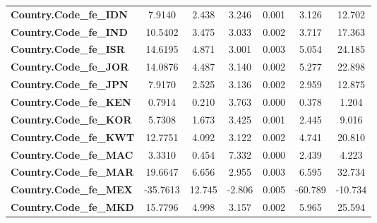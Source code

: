 \begin{center}
\begin{tabular}{lcccccc}
\textbf{Country.Code\_fe\_IDN}                                     &       7.9140  &        2.438     &     3.246  &         0.001        &        3.126    &       12.702     \\
\textbf{Country.Code\_fe\_IND}                                     &      10.5402  &        3.475     &     3.033  &         0.002        &        3.717    &       17.363     \\
\textbf{Country.Code\_fe\_ISR}                                     &      14.6195  &        4.871     &     3.001  &         0.003        &        5.054    &       24.185     \\
\textbf{Country.Code\_fe\_JOR}                                     &      14.0876  &        4.487     &     3.140  &         0.002        &        5.277    &       22.898     \\
\textbf{Country.Code\_fe\_JPN}                                     &       7.9170  &        2.525     &     3.136  &         0.002        &        2.959    &       12.875     \\
\textbf{Country.Code\_fe\_KEN}                                     &       0.7914  &        0.210     &     3.763  &         0.000        &        0.378    &        1.204     \\
\textbf{Country.Code\_fe\_KOR}                                     &       5.7308  &        1.673     &     3.425  &         0.001        &        2.445    &        9.016     \\
\textbf{Country.Code\_fe\_KWT}                                     &      12.7751  &        4.092     &     3.122  &         0.002        &        4.741    &       20.810     \\
\textbf{Country.Code\_fe\_MAC}                                     &       3.3310  &        0.454     &     7.332  &         0.000        &        2.439    &        4.223     \\
\textbf{Country.Code\_fe\_MAR}                                     &      19.6647  &        6.656     &     2.955  &         0.003        &        6.595    &       32.734     \\
\textbf{Country.Code\_fe\_MEX}                                     &     -35.7613  &       12.745     &    -2.806  &         0.005        &      -60.789    &      -10.734     \\
\textbf{Country.Code\_fe\_MKD}                                     &      15.7796  &        4.998     &     3.157  &         0.002        &        5.965    &       25.594     \\

\end{tabular}
\end{center}
